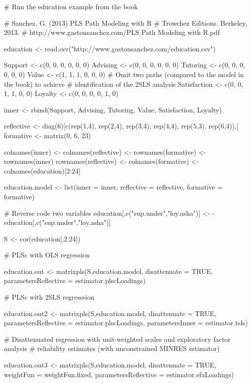 \documentclass[a4paper]{book}
\begin{document}
%
\begin{Examples}
\begin{ExampleCode}
# Run the education example from the book

# Sanchez, G. (2013) PLS Path Modeling with R
# Trowchez Editions. Berkeley, 2013. 
# http://www.gastonsanchez.com/PLS Path Modeling with R.pdf

education <- read.csv("http://www.gastonsanchez.com/education.csv")

Support <- c(0, 0, 0, 0, 0, 0)
Advising <- c(0, 0, 0, 0, 0, 0)
Tutoring <- c(0, 0, 0, 0, 0, 0)
Value <- c(1, 1, 1, 0, 0, 0)
# Omit two paths (compared to the model in the book) to achieve 
# identification of the 2SLS analysis
Satisfaction <- c(0, 0, 1, 1, 0, 0)
Loyalty <- c(0, 0, 0, 0, 1, 0)

inner <- rbind(Support, Advising, Tutoring, Value, Satisfaction, Loyalty)


reflective <- diag(6)[c(rep(1,4),
                        rep(2,4),
                        rep(3,4),
                        rep(4,4),
                        rep(5,3),
                        rep(6,4)),]
formative <- matrix(0, 6, 23)

colnames(inner) <- colnames(reflective) <- rownames(formative) <- rownames(inner)
rownames(reflective) <- colnames(formative) <- colnames(education)[2:24]

education.model <- list(inner = inner,
              reflective = reflective,
              formative = formative)

# Reverse code two variables
education[,c("sup.under","loy.asha")] <- - education[,c("sup.under","loy.asha")]

S <- cor(education[,2:24])

# PLSc with OLS regression

education.out <- matrixpls(S,education.model,
                      disattenuate = TRUE,
                      parametersReflective = estimator.plscLoadings)

# PLSc with 2SLS regresssion

education.out2 <- matrixpls(S,education.model,
                      disattenuate = TRUE,
                      parametersReflective = estimator.plscLoadings,
                      parametersInner = estimator.tsls)


# Disattenuated regression with unit-weighted scales and exploratory factor analysis
# reliability estimates (with unconstrained MINRES estimator)

education.out3 <- matrixpls(S,education.model,
                       disattenuate = TRUE,
                       weightFun = weightFun.fixed,
                       parametersReflective = estimator.efaLoadings)


\end{ExampleCode}
\end{Examples}
\end{document}
